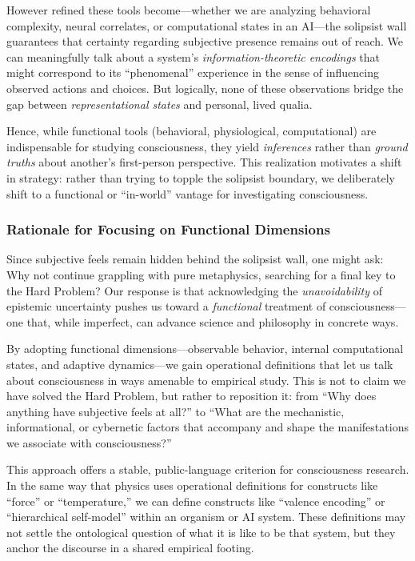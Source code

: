 \documentclass[12pt]{article}
\begin{document}
However refined these tools become---whether we are analyzing behavioral complexity, neural correlates, or computational states in an AI---the solipsist wall guarantees that certainty regarding subjective presence remains out of reach. We can meaningfully talk about a system's \textit{information-theoretic encodings} that might correspond to its ``phenomenal'' experience in the sense of influencing observed actions and choices. But logically, none of these observations bridge the gap between \textit{representational states} and personal, lived qualia.

Hence, while functional tools (behavioral, physiological, computational) are indispensable for studying consciousness, they yield \textit{inferences} rather than \textit{ground truths} about another's first-person perspective. This realization motivates a shift in strategy: rather than trying to topple the solipsist boundary, we deliberately shift to a functional or ``in-world'' vantage for investigating consciousness.

\subsubsection{Rationale for Focusing on Functional Dimensions}

Since subjective feels remain hidden behind the solipsist wall, one might ask: Why not continue grappling with pure metaphysics, searching for a final key to the Hard Problem? Our response is that acknowledging the \textit{unavoidability} of epistemic uncertainty pushes us toward a \textit{functional} treatment of consciousness---one that, while imperfect, can advance science and philosophy in concrete ways.


By adopting functional dimensions---observable behavior, internal computational states, and adaptive dynamics---we gain operational definitions that let us talk about consciousness in ways amenable to empirical study. This is not to claim we have solved the Hard Problem, but rather to reposition it: from ``Why does anything have subjective feels at all?'' to ``What are the mechanistic, informational, or cybernetic factors that accompany and shape the manifestations we associate with consciousness?''

This approach offers a stable, public-language criterion for consciousness research. In the same way that physics uses operational definitions for constructs like ``force'' or ``temperature,'' we can define constructs like ``valence encoding'' or ``hierarchical self-model'' within an organism or AI system. These definitions may not settle the ontological question of what it is like to be that system, but they anchor the discourse in a shared empirical footing.
\end{document}
